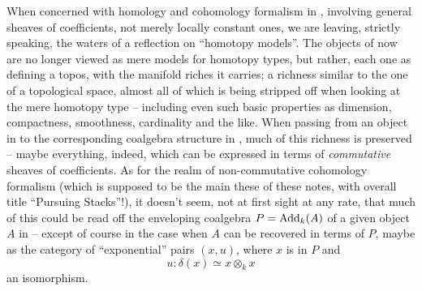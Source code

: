 When concerned with homology and cohomology formalism in \Cat,
involving general sheaves of coefficients, not merely locally constant
ones, we are leaving, strictly speaking, the waters of a reflection on
``homotopy models''. The objects of \Cat{} now are no longer viewed as
mere models for homotopy types, but rather, each one as defining a
topos, with the manifold riches it carries; a richness similar to the
one of a topological space, almost all of which is being stripped off
when looking at the mere homotopy type -- including even such basic
properties as dimension, compactness, smoothness, cardinality and the
like. When passing from an object in \Cat{} to the corresponding
coalgebra structure in \Cat, much of this richness is preserved --
maybe everything, indeed, which can be expressed in terms of
\emph{commutative} sheaves of coefficients. As for the realm of
non-commutative cohomology formalism (which is supposed to be the main
these of these notes, with overall title ``Pursuing Stacks''!), it
doesn't seem, not at first sight at any rate, that much of this could
be read off the enveloping coalgebra $P=\operatorname{Add}_k(A)$ of a given object
$A$ in \Cat{} -- except of course in the case when $A$ can be
recovered in terms of $P$, maybe as the category of ``exponential''
pairs $(x,u)$, where $x$ is in $P$ and
\[ u:\delta(x) \simeq x \otimes_k x\]
an isomorphism.

\bigbreak

\presectionfill{}\par

